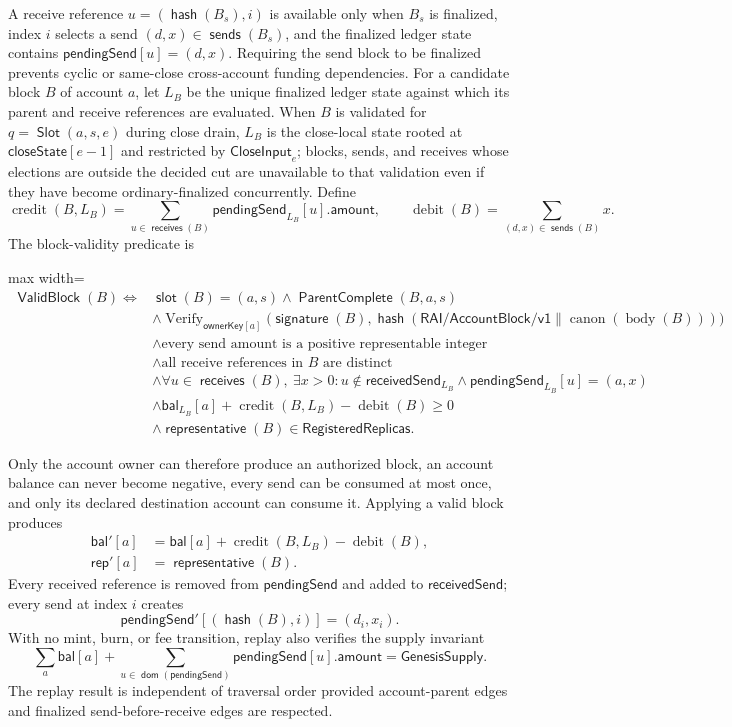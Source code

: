 \documentclass[sigplan,twocolumn,review,anonymous]{acmart}
\newcommand{\func}[1]{\operatorname{\mathsf{#1}}}
\newcommand{\hash}{\func{hash}}
\newcommand{\Slot}{\func{Slot}}
\newcommand{\dom}{\func{dom}}
\newcommand{\ParentComplete}{\func{ParentComplete}}
\newcommand{\ValidBlock}{\func{ValidBlock}}
\newcommand{\slotOf}{\func{slot}}
\newcommand{\closeState}{\mathsf{closeState}}
\newcommand{\ownerKey}{\mathsf{ownerKey}}
\newcommand{\signatureOf}{\func{signature}}
\newcommand{\sendsOf}{\func{sends}}
\newcommand{\receivesOf}{\func{receives}}
\newcommand{\representativeOf}{\func{representative}}
\newcommand{\bal}{\mathsf{bal}}
\newcommand{\repOf}{\mathsf{rep}}
\newcommand{\pendingSend}{\mathsf{pendingSend}}
\newcommand{\receivedSend}{\mathsf{receivedSend}}
\begin{document}
A receive reference \(u=(\hash(B_s),i)\) is available only when \(B_s\) is finalized, index \(i\)
selects a send \((d,x)\in\sendsOf(B_s)\), and the finalized ledger state contains
\(\pendingSend[u]=(d,x)\).  Requiring the send block to be finalized prevents cyclic or same-close
cross-account funding dependencies.  For a candidate block \(B\) of account \(a\), let \(L_B\) be the
unique finalized ledger state against which its parent and receive references are evaluated.  When
\(B\) is validated for \(q=\Slot(a,s,e)\) during close drain, \(L_B\) is the close-local state rooted at
\(\closeState[e-1]\) and restricted by \(\mathsf{CloseInput}_e\); blocks, sends, and receives whose
elections are outside the decided cut are unavailable to that validation even if they have become
ordinary-finalized concurrently.  Define
\[
\operatorname{credit}(B,L_B)=
\sum_{u\in\receivesOf(B)}\pendingSend_{L_B}[u].\mathsf{amount},
\qquad
\operatorname{debit}(B)=\sum_{(d,x)\in\sendsOf(B)}x.
\]
The block-validity predicate is
\begin{center}
\begin{adjustbox}{max width=\columnwidth}
\(\displaystyle
\begin{aligned}
\ValidBlock(B)\iff{}& \slotOf(B)=(a,s)\wedge\ParentComplete(B,a,s)\\
&\wedge\operatorname{Verify}_{\ownerKey[a]}
 \bigl(\signatureOf(B),
 \hash(\mathsf{RAI/AccountBlock/v1}\parallel\operatorname{canon}(\operatorname{body}(B)))\bigr)\\
&\wedge\text{every send amount is a positive representable integer}\\
&\wedge\text{all receive references in }B\text{ are distinct}\\
&\wedge\forall u\in\receivesOf(B),\ \exists x>0:
 u\notin\receivedSend_{L_B}\wedge\pendingSend_{L_B}[u]=(a,x)\\
&\wedge\bal_{L_B}[a]+\operatorname{credit}(B,L_B)-\operatorname{debit}(B)\ge0\\
&\wedge\representativeOf(B)\in\mathsf{RegisteredReplicas}.
\end{aligned}
\)
\end{adjustbox}
\end{center}
Only the account owner can therefore produce an authorized block, an account balance can never become
negative, every send can be consumed at most once, and only its declared destination account can consume
it.  Applying a valid block produces
\[
\begin{aligned}
\bal'[a]&=\bal[a]+\operatorname{credit}(B,L_B)-\operatorname{debit}(B),\\
\repOf'[a]&=\representativeOf(B).
\end{aligned}
\]
Every received reference is removed from \(\pendingSend\) and added to \(\receivedSend\); every send
at index \(i\) creates
\[
\pendingSend'[(\hash(B),i)]=(d_i,x_i).
\]
With no mint, burn, or fee transition, replay also verifies the supply invariant
\[
\sum_a\bal[a]+\sum_{u\in\dom(\pendingSend)}\pendingSend[u].\mathsf{amount}
=\mathsf{GenesisSupply}.
\]
The replay result is independent of traversal order provided account-parent edges and finalized
send-before-receive edges are respected.
\end{document}

